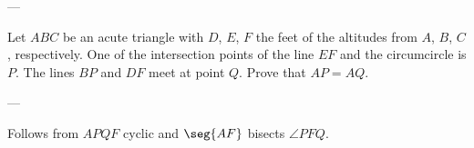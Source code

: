 
---

Let $ABC$ be an acute triangle with $D$, $E$, $F$ the feet of the altitudes from $A$, $B$, $C$, respectively. One of the intersection points of the line $EF$ and the circumcircle is $P$. The lines $BP$ and $DF$ meet at point $Q$. Prove that $AP=AQ$.

---

Follows from $APQF$ cyclic and $\seg{AF}$ bisects $\angle PFQ$.
